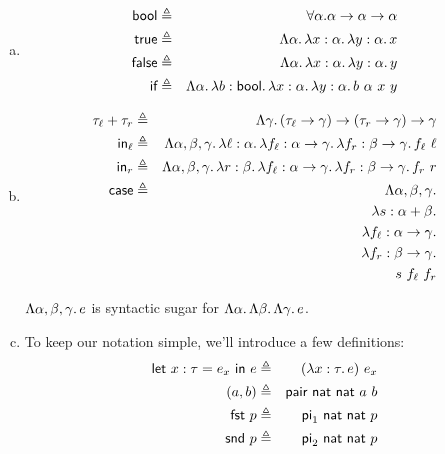 \begin{enumerate}[(a)]
\item \begin{eqnarray*}
    \textsf{bool}  & \triangleq & \forall \alpha . \alpha \rightarrow \alpha \rightarrow \alpha \\
    \textsf{true}  & \triangleq & \Lambda {\alpha} .\,\lambda {x}:{\alpha}.\,{\lambda {y}:{\alpha}.\,{x}} \\
    \textsf{false} & \triangleq & \Lambda {\alpha} .\,\lambda {x}:{\alpha}.\,{\lambda {y}:{\alpha}.\,{y}} \\
    \textsf{if}    & \triangleq & \Lambda {\alpha} .\,\lambda {b}:{\textsf{bool}}.\,{\lambda {x}:{\alpha}.\,{\lambda {y}:{\alpha}.\,{b~\alpha~x~y}}}
\end{eqnarray*}

\item \begin{eqnarray*}
    \tau_\ell + \tau_r & \definedAs & \Fun \gamma {(\tlToGamma) \rightarrow (\trToGamma) \rightarrow \gamma} \\
    \In_\ell           & \definedAs & \Fun {\alpha, \beta, \gamma} {\fun \ell \alpha {\fun {f_\ell} {\alpha \rightarrow \gamma} {\fun {f_r} {\beta \rightarrow \gamma} {f_\ell~\ell}}}} \\
    \In_r              & \definedAs & \Fun {\alpha, \beta, \gamma} {\fun r \beta {\fun {f_\ell} {\alpha \rightarrow \gamma} {\fun {f_r} {\beta \rightarrow \gamma} {f_r~r}}}} \\
    \case              & \definedAs & \FN {\alpha, \beta, \gamma} \\
                       &            & \hspace{5mm}  \Fn s     {\alpha + \beta} \\
                       &            & \hspace{10mm} \Fn {f_\ell} {\alpha \rightarrow \gamma} \\
                       &            & \hspace{15mm} \Fn {f_r} {\beta \rightarrow \gamma} \\
                       &            & \hspace{20mm} s~f_\ell~f_r
\end{eqnarray*}

$\Lambda {\alpha, \beta, \gamma} .\,e$ is syntactic sugar for $\Lambda {\alpha} .\,\Lambda {\beta} .\,\Lambda {\gamma} .\,e$.

\item To keep our notation simple, we'll introduce a few definitions:
\begin{eqnarray*}
    {\sf let}~{x}:{\tau} = {e_x}~{\sf in}~{e} & \triangleq & (\lambda {x}:{\tau}.\,{e})~e_x \\
    (a, b)              & \triangleq & \textsf{pair}~\textsf{nat}~\textsf{nat}~a~b \\
    \textsf{fst}~p              & \triangleq & \textsf{pi}_1~\textsf{nat}~\textsf{nat}~p \\
    \textsf{snd}~p              & \triangleq & \textsf{pi}_2~\textsf{nat}~\textsf{nat}~p \\
\end{eqnarray*}


\end{enumerate}
